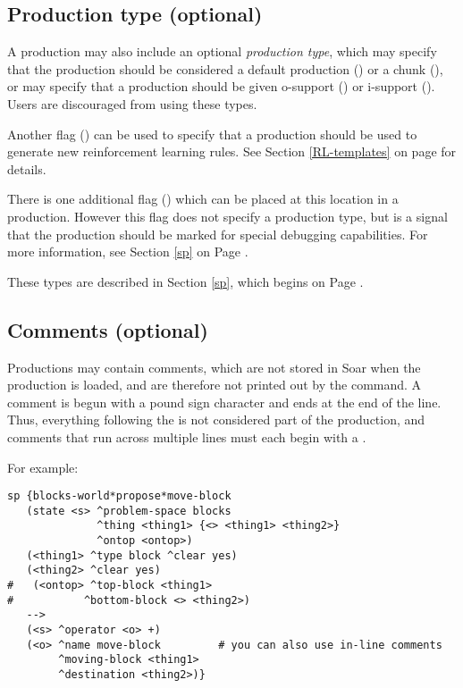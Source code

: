 \subsection{Production type (optional)}

A production may also include an optional \emph{production type}, which
may specify that the production should be considered a default
production () or a chunk (), or may specify
that a production should be given o-support () or
i-support ().  Users are discouraged from using these
types.  

Another flag () can be used to specify that a production should
be used to generate new reinforcement learning rules. See Section \ref{RL-templates} 
on page \pageref{RL-templates} for details.

There is one additional flag () which can be placed at this location
in a production. However this flag does not specify a production type, but is
a signal that the production should be marked for special debugging capabilities. For more
information, see Section \ref{sp} on Page \pageref{sp}.

These types are described in Section \ref{sp}, which begins on Page \pageref{sp}.
\subsection{Comments (optional)}

Productions may contain comments, which are not stored in Soar when the
production is loaded, and are therefore not printed out by the
 command. A comment is begun with a pound sign character
\soar{\#} and ends at the end of the line.  Thus, everything following
the \soar{\#} is not considered part of the production, and comments
that run across multiple lines must each begin with a \soar{\#}.

For example:
\begin{verbatim}
sp {blocks-world*propose*move-block
   (state <s> ^problem-space blocks
              ^thing <thing1> {<> <thing1> <thing2>}
              ^ontop <ontop>)
   (<thing1> ^type block ^clear yes)
   (<thing2> ^clear yes)
#   (<ontop> ^top-block <thing1>
#           ^bottom-block <> <thing2>)
   -->
   (<s> ^operator <o> +)
   (<o> ^name move-block         # you can also use in-line comments
        ^moving-block <thing1>
        ^destination <thing2>)}
\end{verbatim}

